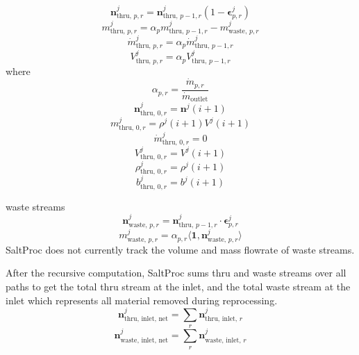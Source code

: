 \begin{equation}
    \mathbf{n}^{j}_{\text{thru, }p,r} = \mathbf{n}^{j}_{\text{thru, }p-1,r} (1 - \mathbf{\epsilon}^{j}_{p,r})
\end{equation}
\begin{equation}
    m^{j}_{\text{thru, } p,r} = \alpha_{p} m^{j}_{\text{thru, }p-1,r} - m^{j}_{\text{waste, }p,r}
\end{equation}
\begin{equation}
    \dot{m}^{j}_{\text{thru, }p,r} = \alpha_{p}\dot{m}^{j}_{\text{thru, }p-1,r}
\end{equation}
\begin{equation}
    V^{j}_{\text{thru, }p,r} = \alpha_{p}V^{j}_{\text{thru, }p-1,r}
\end{equation}
where 
\begin{equation}
    \alpha_{p,r} = \frac{\dot{m}_{p,r}}{\dot{m}_{\text{outlet}}}
\end{equation}
\begin{equation}
    \mathbf{n}^{j}_{\text{thru, }0,r} = \mathbf{n}^{j}(i+1)
\end{equation}
\begin{equation}
    m^{j}_{\text{thru, }0,r} = \rho^{j}(i+1)V^{j}(i+1)
\end{equation}
\begin{equation}
    \dot{m}^{j}_{\text{thru, }0,r} = 0
\end{equation}
\begin{equation}
    V^{j}_{\text{thru, }0,r} = V^{j}(i+1)
\end{equation}
\begin{equation}
    \rho^{j}_{\text{thru, }0,r} = \rho^{j}(i+1)
\end{equation}
\begin{equation}
    b^{j}_{\text{thru, }0,r} = b^{j}(i+1)
\end{equation}

waste streams
\begin{equation}
    \mathbf{n}^{j}_{\text{waste, }p,r} = \mathbf{n}^{j}_{\text{thru, }p-1,r} \cdot \mathbf{\epsilon}^{j}_{p,r}
\end{equation}
\begin{equation}
    m^{j}_{\text{waste, }p,r} = \alpha_{p,r} \langle\mathbf{1},\mathbf{n}^{j}_{\text{waste, }p,r}\rangle
\end{equation}
SaltProc does not currently track the volume and mass flowrate of waste streams.

After the recursive computation, SaltProc sums thru and waste streams over all
paths to get the total thru stream at the inlet, and the total waste stream at
the inlet which represents all material removed during reprocessing.
\begin{equation}
    \mathbf{n}^{j}_{\text{thru, inlet, net}} = \sum_{r} \mathbf{n}^{j}_{\text{thru, inlet, }r}
\end{equation}
\begin{equation}
    \mathbf{n}^{j}_{\text{waste, inlet, net}} = \sum_{r} \mathbf{n}^{j}_{\text{waste, inlet, }r}
\end{equation}
